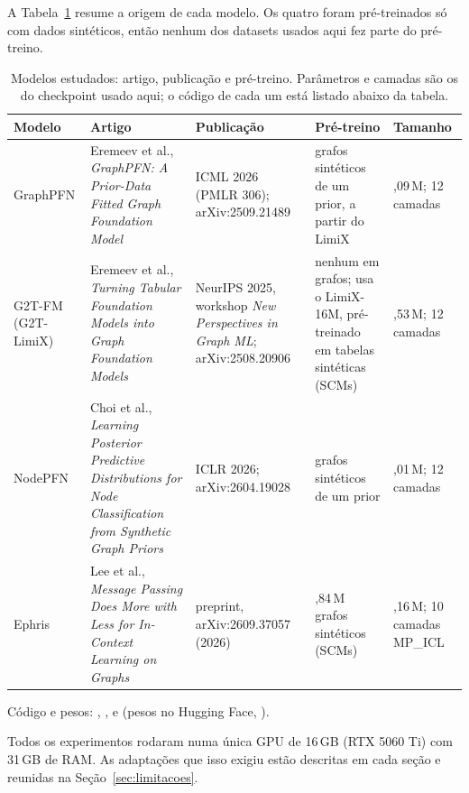 \documentclass[12pt,a4paper]{article}
\begin{document}
A Tabela~\ref{tab:modelos} resume a origem de cada modelo. Os quatro foram pré-treinados só com dados sintéticos, então nenhum dos datasets usados aqui fez parte do pré-treino.

\begin{table}[H]
\centering
\caption{Modelos estudados: artigo, publicação e pré-treino. Parâmetros e camadas são os do checkpoint usado aqui; o código de cada um está listado abaixo da tabela.}
\label{tab:modelos}
\small
\begin{tabular}{@{}>{\raggedright\arraybackslash}p{1.9cm}>{\raggedright\arraybackslash}p{4.3cm}>{\raggedright\arraybackslash}p{3.0cm}>{\raggedright\arraybackslash}p{3.2cm}>{\raggedright\arraybackslash}p{1.9cm}@{}}
\toprule
Modelo & Artigo & Publicação & Pré-treino & Tamanho \\
\midrule
GraphPFN & Eremeev et al., \emph{GraphPFN: A Prior-Data Fitted Graph Foundation Model} & ICML 2026 (PMLR 306); arXiv:2509.21489 & grafos sintéticos de um prior, a partir do LimiX & 20,09\,M; 12 camadas \\
\addlinespace
G2T-FM (G2T-LimiX) & Eremeev et al., \emph{Turning Tabular Foundation Models into Graph Foundation Models} & NeurIPS 2025, workshop \emph{New Perspectives in Graph ML}; arXiv:2508.20906 & nenhum em grafos; usa o LimiX-16M, pré-treinado em tabelas sintéticas (SCMs) & 16,53\,M; 12 camadas \\
\addlinespace
NodePFN & Choi et al., \emph{Learning Posterior Predictive Distributions for Node Classification from Synthetic Graph Priors} & ICLR 2026; arXiv:2604.19028 & grafos sintéticos de um prior & 29,01\,M; 12 camadas \\
\addlinespace
Ephris & Lee et al., \emph{Message Passing Does More with Less for In-Context Learning on Graphs} & preprint, arXiv:2609.37057 (2026) & 3,84\,M grafos sintéticos (SCMs) & 50,16\,M; 10 camadas MP\_ICL \\
\bottomrule
\end{tabular}
\end{table}

{\raggedright\noindent Código e pesos: , ,  e  (pesos no Hugging Face, ).\par}

Todos os experimentos rodaram numa única GPU de 16\,GB (RTX 5060 Ti) com 31\,GB de RAM. As adaptações que isso exigiu estão descritas em cada seção e reunidas na Seção~\ref{sec:limitacoes}.
\end{document}
